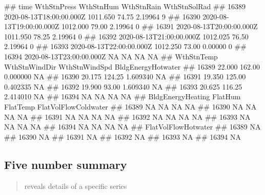 \documentclass[
]{book}
\newenvironment{Shaded}{\begin{snugshade}}{\end{snugshade}}
\newcommand{\KeywordTok}[1]{\textcolor[rgb]{0.13,0.29,0.53}{\textbf{#1}}}
\newcommand{\NormalTok}[1]{#1}
\newcommand{\OperatorTok}[1]{\textcolor[rgb]{0.81,0.36,0.00}{\textbf{#1}}}
\let\oldShaded\Shaded
\let\endoldShaded\endShaded
\renewenvironment{Shaded}{\footnotesize\oldShaded}{\endoldShaded}
\let\oldverbatim\verbatim
\let\endoldverbatim\endverbatim
\renewenvironment{verbatim}{\footnotesize\oldverbatim}{\endoldverbatim}
\begin{document}
\begin{verbatim}
##                           time WthStnPress WthStnHum WthStnRain WthStnSolRad
## 16389 2020-08-13T18:00:00.000Z    1011.650     74.75    2.19964            9
## 16390 2020-08-13T19:00:00.000Z    1012.000     79.00    2.19964            0
## 16391 2020-08-13T20:00:00.000Z    1011.950     78.25    2.19964            0
## 16392 2020-08-13T21:00:00.000Z    1012.025     76.50    2.19964            0
## 16393 2020-08-13T22:00:00.000Z    1012.250     73.00    0.00000            0
## 16394 2020-08-13T23:00:00.000Z          NA        NA         NA           NA
##       WthStnTemp WthStnWindDir WthStnWindSpd BldgEnergyHotwater
## 16389     22.000        162.00      0.000000                 NA
## 16390     20.175        124.25      1.609340                 NA
## 16391     19.350        125.00      0.402335                 NA
## 16392     19.900         93.00      1.609340                 NA
## 16393     20.625        116.25      2.414010                 NA
## 16394         NA            NA            NA                 NA
##       BldgEnergyHeating FlatHum FlatTemp FlatVolFlowColdwater
## 16389                NA      NA       NA                   NA
## 16390                NA      NA       NA                   NA
## 16391                NA      NA       NA                   NA
## 16392                NA      NA       NA                   NA
## 16393                NA      NA       NA                   NA
## 16394                NA      NA       NA                   NA
##       FlatVolFlowHotwater
## 16389                  NA
## 16390                  NA
## 16391                  NA
## 16392                  NA
## 16393                  NA
## 16394                  NA
\end{verbatim}

\hypertarget{five-number-summary}{%
\subsection{Five number summary}\label{five-number-summary}}

\begin{quote}
reveals details of a specific series
\end{quote}

\begin{Shaded}
\end{Shaded}
\end{document}
